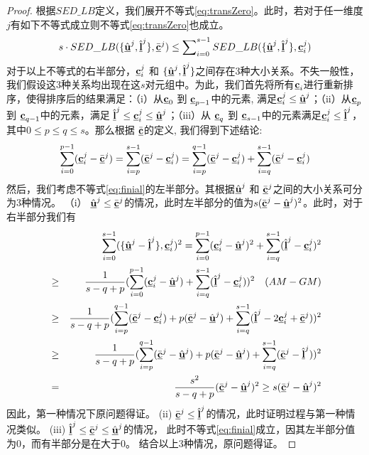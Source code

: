 \begin{proof}
	根据$SED\_LB$定义，我们展开不等式\ref{eq:transZero}。此时，若对于任一维度$j$有如下不等式成立则不等式\ref{eq:transZero}也成立。
	\begin{eqnarray}\label{eq:finial}
	s\cdot SED\_LB(\{\hat{\vu}^{j},\hat{\vl}^{j} \},\bar{\vc}^{j}) \le \sum\nolimits_{i=0}^{s-1}SED\_LB(\{\hat{\vu}^{j},\hat{\vl}^{j} \},{\vc}_{i}^{j})
	\end{eqnarray}
	对于以上不等式的右半部分，${\vc}_{i}^{j}$ 和 $\{\hat{\vu}^{j},\hat{\vl}^{j}\}$之间存在3种大小关系。不失一般性，我们假设这3种关系均出现在这$s$对元组中。为此，我们首先将所有$\vc_{i}$进行重新排序，使得排序后的结果满足：（i）从${\vc}_{0}$ 到 ${\vc}_{p-1}$中的元素, 满足${\vc}_{i}^{j} \le \hat{\vu}^{j}$；（ii）从${\vc}_{p}$ 到 ${\vc}_{q-1}$中的元素，满足 $\hat{\vl}^{j} \le {\vc}_{i}^{j} \le \hat{\vu}^{j}$；（iii）从 ${\vc}_{q}$ 到 ${\vc}_{s-1}$中的元素满足${\vc}_{i}^{j} \le \hat{\vl}^{j}$，其中$0\le p \le q \le s$。那么根据  $\bar{\vc}$的定义, 我们得到下述结论:
	\begin{eqnarray}\label{eq:mean}
	\sum_{i=0}^{p-1}(\vc_{i}^{j}- \bar{\vc}^{j})=\sum_{i=p}^{s-1}(\bar{\vc}^{j}- \vc_{i}^{j})=
	\sum_{i=p}^{q-1}(\bar{\vc}^{j}- \vc_{i}^{j}) +
	\sum_{i=q}^{s-1}(\bar{\vc}^{j}- \vc_{i}^{j})
	\end{eqnarray}
	然后，我们考虑不等式\ref{eq:finial}的左半部分。其根据$\hat{\vu}^{j}$ 和 $\bar{\vc}^{j}$之间的大小关系可分为3种情况。
（i） $\hat{\vu}^{j} \le \bar{\vc}^{j}$的情况，此时左半部分的值为$s  (\bar{\vc}^{j}-\hat{\vu}^{j})^2$。此时，对于右半部分我们有
	\allowdisplaybreaks
	\begin{eqnarray}\label{eq:prove5R}
	&&\sum_{i=0}^{s-1}(\{ \hat{\vu}^{j} - \hat{\vl}^{j} \}, \vc_{i}^{j})^2 =
	\sum_{i=0}^{p-1}(\vc_{i}^{j} - \hat{\vu}^{j})^2 + \sum_{i=q}^{s-1}(\hat{\vl}^{j} - \vc_{i}^{j})^2 \nonumber \\
	&\ge& \frac{1}{s-q+p} (\sum_{i=0}^{p-1}(\vc_{i}^{j} - \hat{\vu}^{j}) + \sum_{i=q}^{s-1}(\hat{\vl}^{j}- \vc_{i}^{j}))^2  \quad (AM-GM) \nonumber \\
	&\ge& \frac{1}{s-q+p} (\sum_{i=p}^{q-1}(\bar{\vc}^{j}- \vc_{i}^{j}) + p (\bar{\vc}^{j}-\hat{\vu}^{j})+  \sum_{i=q}^{s-1}(\hat{\vl}^{j}- 2 \vc_{i}^{j} + \bar{\vc}^{j}))^2  \nonumber \\
	&\ge&\frac{1}{s-q+p}  (\sum_{i=p}^{q-1}(\bar{\vc}^{j}- \hat{\vu}^{j})  + p (\bar{\vc}^{j}-\hat{\vu}^{j}) + \sum_{i=q}^{s-1}(\bar{\vc}^{j}-\hat{\vl}^{j}) )^2 \nonumber \\
	&=&\frac{s^{2}}{s-q+p} (\bar{\vc}^{j}-\hat{\vu}^{j})^2 \ge s  (\bar{\vc}^{j}-\hat{\vu}^{j})^2
	\end{eqnarray}
	\allowdisplaybreaks[4]
	因此，第一种情况下原问题得证。
	(ii) $\bar{\vc}^{j} \le \hat{\vl}^{j}$的情况，此时证明过程与第一种情况类似。
	(iii) $\hat{\vl}^{j} \le \bar{\vc}^{j} \le \hat{\vu}^{j}$的情况， 此时不等式\ref{eq:finial}成立，因其左半部分值为0，而有半部分是在大于0。
	结合以上3种情况，原问题得证。
\end{proof}


